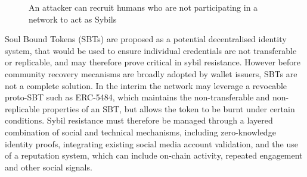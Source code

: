 \documentclass[11pt,a4paper]{article}
\begin{document}
\begin{figure}[H]
    \centering
    \caption{An attacker can recruit humans who are not participating in a network to act as Sybils}
    \label{fig:sybil-attack}
\end{figure}
\vspace{0.1cm}

Soul Bound Tokens (SBTs) are proposed as a potential decentralised identity system, that would be used to ensure individual credentials are not transferable or replicable, and may therefore prove critical in sybil resistance.
However before community recovery mecanisms are broadly adopted by wallet issuers, SBTs are not a complete solution.
In the interim the network may leverage a revocable proto-SBT such as ERC-5484, which maintains the non-transferable and non-replicable properties of an SBT, but allows the token to be burnt under certain conditions.
Sybil resistance must therefore be managed through a layered combination of social and technical mechanisms, including zero-knowledge identity proofs, integrating existing social media account validation, and the use of a reputation system, which can include on-chain activity, repeated engagement and other social signals.
\end{document}
